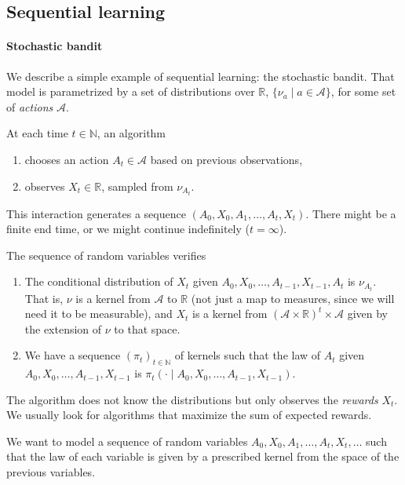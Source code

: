 
\subsection{Sequential learning}
\label{sub:sequential_learning}

\paragraph{Stochastic bandit}

We describe a simple example of sequential learning: the stochastic bandit. That model is parametrized by a set of distributions over $\mathbb{R}$, $\{\nu_a \mid a \in \mathcal A\}$, for some set of \emph{actions} $\mathcal A$.

At each time $t \in \mathbb{N}$, an algorithm
\begin{enumerate}
	\item chooses an action $A_t \in \mathcal A$ based on previous observations,
	\item observes $X_t \in \mathbb{R}$, sampled from $\nu_{A_t}$.
\end{enumerate}

This interaction generates a sequence $(A_0, X_0, A_1, \ldots, A_t, X_t)$. There might be a finite end time, or we might continue indefinitely ($t = \infty$).

The sequence of random variables verifies \cite{lattimore2020bandit}
\begin{enumerate}
    \item The conditional distribution of $X_t$ given $A_0, X_0, \ldots, A_{t-1}, X_{t-1}, A_t$ is $\nu_{A_t}$. That is, $\nu$ is a kernel from $\mathcal A$ to $\mathbb{R}$ (not just a map to measures, since we will need it to be measurable), and $X_t$ is a kernel from $(\mathcal A \times \mathbb{R})^t \times \mathcal A$ given by the extension of $\nu$ to that space.
    \item We have a sequence $(\pi_t)_{t\in \mathbb{N}}$ of kernels such that the law of $A_t$ given $A_0, X_0, \ldots, A_{t-1}, X_{t-1}$ is $\pi_t(\cdot \mid A_0, X_0, \ldots, A_{t-1}, X_{t-1})$.
\end{enumerate}

The algorithm does not know the distributions but only observes the \emph{rewards} $X_t$. We usually look for algorithms that maximize the sum of expected rewards.

\begin{remark}
We want to model a sequence of random variables $A_0, X_0, A_1, \ldots, A_t, X_t, \ldots$ such that the law of each variable is given by a prescribed kernel from the space of the previous variables.
\end{remark}

